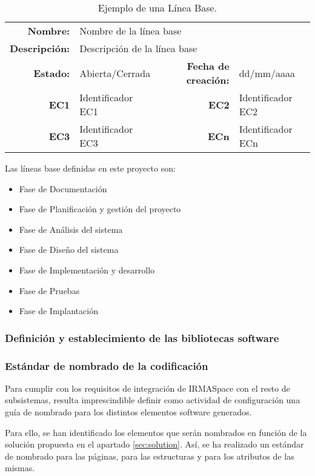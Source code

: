 \begin{table}[h]
\begin{center}
\begin{tabular}{ r l | r l }
\hline
\textbf{Nombre:} & \multicolumn{3}{l}{Nombre de la línea base} \\
\textbf{Descripción:} & \multicolumn{3}{l}{Descripción de la línea base} \\ \hline \hline
\textbf{Estado:} & Abierta/Cerrada & \textbf{Fecha de creación:} & dd/mm/aaaa \\
\textbf{EC1} & Identificador EC1 & \textbf{EC2} & Identificador EC2 \\
\textbf{EC3} & Identificador EC3 & \textbf{ECn} & Identificador ECn \\
\hline
\end{tabular}
\caption{Ejemplo de una Línea Base.}
\label{tab:baseLine}
\end{center}
\end{table}

\par Las líneas base definidas en este proyecto son:
\begin{itemize}[-]
  \item Fase de Documentación
  \item Fase de Planificación y gestión del proyecto
  \item Fase de Análisis del sistema
  \item Fase de Diseño del sistema
  \item Fase de Implementación y desarrollo
  \item Fase de Pruebas
  \item Fase de Implantación
\end{itemize}


\subsubsection{Definición y establecimiento de las bibliotecas software}


\subsubsection{Estándar de nombrado de la codificación}
\par Para cumplir con los requisitos de integración de IRMASpace con el resto de subsistemas, resulta imprescindible definir como actividad de configuración una guía de nombrado para los distintos elementos software generados.
\par Para ello, se han identificado los elementos que serán nombrados en función de la solución propuesta en el apartado \ref{sec:solution}. Así, se ha realizado un estándar de nombrado para las páginas, para las estructuras y para los atributos de las mismas.

